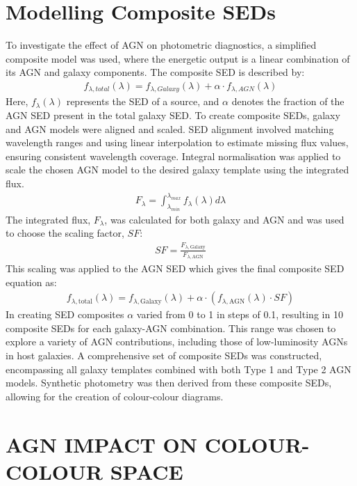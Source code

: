 \documentclass[
  journal=pasa,
  manuscript=research-paper,
  year=202X,
  volume=YY,
]{cup-journal}
\begin{document}
\section{Modelling Composite SEDs}
\label{sec:ModelSEDs}

To investigate the effect of AGN on photometric diagnostics, a simplified composite model was used, where the energetic output is a linear combination of its AGN and galaxy components. The composite SED is described by:
\begin{align*}
f_{\lambda, total}(\lambda) = f_{\lambda, Galaxy}(\lambda) + \alpha \cdot f_{\lambda, AGN}(\lambda)
\end{align*}
Here, $f_{\lambda}(\lambda)$ represents the SED of a source, and $\alpha$ denotes the fraction of the AGN SED present in the total galaxy SED. To create composite SEDs, galaxy and AGN models were aligned and scaled. SED alignment involved matching wavelength ranges and using linear interpolation to estimate missing flux values, ensuring consistent wavelength coverage. Integral normalisation was applied to scale the chosen AGN model to the desired galaxy template using the integrated flux.
\begin{align*}
F_{\lambda} = \int_{\lambda_{min}}^{\lambda_{max}} f_\lambda(\lambda) d\lambda
\end{align*}
The integrated flux, $F_{\lambda}$, was calculated for both galaxy and AGN and was used to choose the scaling factor, $SF$:
\begin{align*}
SF = \frac{F_{\lambda, \text{Galaxy}}}{F_{\lambda, \text{AGN}}}
\end{align*}
This scaling was applied to the AGN SED which gives the final composite SED equation as:
\begin{align*}
f_{\lambda, \text{total}}(\lambda) = f_{\lambda, \text{Galaxy}}(\lambda) + \alpha \cdot (f_{\lambda, \text{AGN}}(\lambda) \cdot SF)
\end{align*}
In creating SED composites $\alpha$ varied from 0 to 1 in steps of 0.1, resulting in 10 composite SEDs for each galaxy-AGN combination. This range was chosen to explore a variety of AGN contributions, including those of low-luminosity AGNs in host galaxies. A comprehensive set of composite SEDs was constructed, encompassing all galaxy templates combined with both Type 1 and Type 2 AGN models. Synthetic photometry was then derived from these composite SEDs, allowing for the creation of colour-colour diagrams.
\section{AGN IMPACT ON COLOUR-COLOUR SPACE}
\label{sec:AGNImpact}
\end{document}
